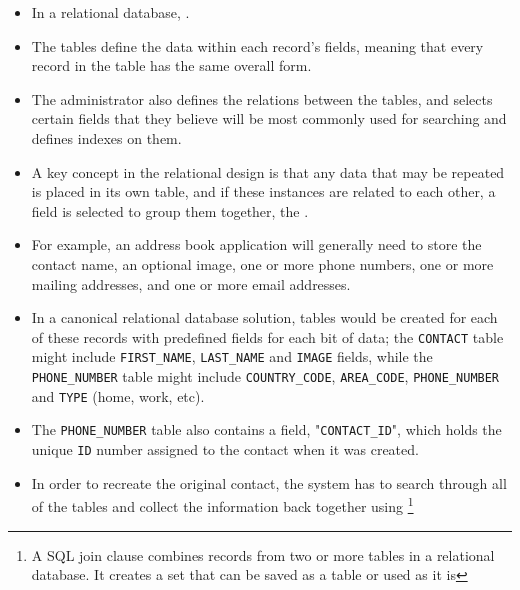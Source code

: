 \begin{itemize}
\item
In a relational database, . 

\item
The tables define the data within each record's
fields, meaning that every record in the table has the same overall
form. 

\item
The administrator also defines the relations between the tables,
and selects certain fields that they believe will be most commonly used
for searching and defines indexes on them. 

\item
A key concept in the relational
design is that any data that may be repeated is placed in its own table,
and if these instances are related to each other, a field is selected
to group them together, the .

\item
For example, an address book application will generally need to
store the contact name, an optional image, one or more phone numbers,
one or more mailing addresses, and one or more email addresses. 

\item
In a
canonical relational database solution, tables would be created for
each of these records with predefined fields for each bit of data; the
\verb|CONTACT| table might include \verb|FIRST_NAME|, \verb|LAST_NAME| and \verb|IMAGE| fields,
while the \verb|PHONE_NUMBER| table might include \verb|COUNTRY_CODE|, \verb|AREA_CODE|,
\verb|PHONE_NUMBER| and \verb|TYPE| (home, work, etc). 

\item
The \verb|PHONE_NUMBER| table also
contains a  field, "\verb|CONTACT_ID|", which holds the unique \verb|ID|
number assigned to the contact when it was created. 

\item
In order to recreate
the original contact, the system has to search through all of the tables
and collect the information back together using \footnote{
A SQL join clause combines records from two or more tables in a relational database. It creates a set that can be saved as a table or used as it is}
\end{itemize}

